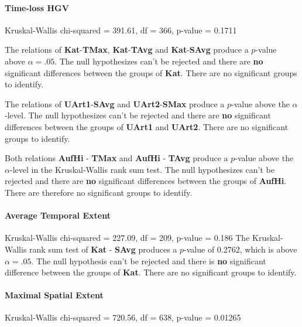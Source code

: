 \paragraph{Time-loss HGV}
Kruskal-Wallis chi-squared = 391.61, df = 366, p-value = 0.1711

The relations of \textbf{Kat}-\textbf{TMax}, \textbf{Kat}-\textbf{TAvg} and \textbf{Kat}-\textbf{SAvg} produce a $p$-value above $\alpha=.05$. The null hypothesizes can't be rejected and there are \textbf{no} significant differences between the groups of \textbf{Kat}. There are no significant groups to identify.

The relations of \textbf{UArt1}-\textbf{SAvg} and \textbf{UArt2}-\textbf{SMax} produce a $p$-value above the $\alpha$-level. The null hypothesizes can't be rejected and there are \textbf{no} significant differences between the groups of \textbf{UArt1} and \textbf{UArt2}. There are no significant groups to identify.

Both relations \textbf{AufHi} - \textbf{TMax} and \textbf{AufHi} - \textbf{TAvg} produce a $p$-value above the $\alpha$-level in the Kruskal-Wallis rank sum test. The null hypothesizes can't be rejected and there are \textbf{no} significant differences between the groups of \textbf{AufHi}. There are therefore no significant groups to identify.


\paragraph{Average Temporal Extent}
Kruskal-Wallis chi-squared = 227.09, df = 209, p-value = 0.186
The Kruskal-Wallis rank sum test of \textbf{Kat} - \textbf{SAvg} produces a $p$-value of 0.2762, which is above $\alpha=.05$. The null hypothesis can't be rejected and there is \textbf{no} significant difference between the groups of \textbf{Kat}. There are no significant groups to identify.

\paragraph{Maximal Spatial Extent}
Kruskal-Wallis chi-squared = 720.56, df = 638, p-value = 0.01265

